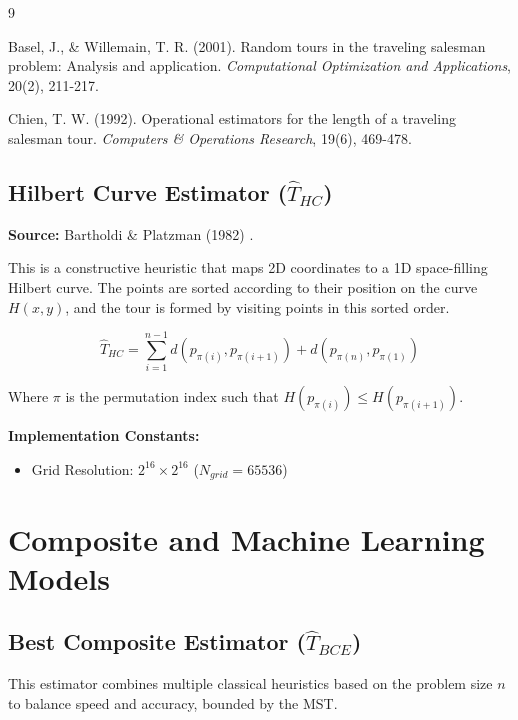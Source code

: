 \documentclass{article}
\begin{document}
\begin{thebibliography}{9}

Basel, J., \& Willemain, T. R. (2001). 
Random tours in the traveling salesman problem: Analysis and application. 
\textit{Computational Optimization and Applications}, 20(2), 211-217.

Chien, T. W. (1992). 
Operational estimators for the length of a traveling salesman tour. 
\textit{Computers \& Operations Research}, 19(6), 469-478.

\end{thebibliography}

\subsection{Hilbert Curve Estimator ($\hat{T}_{HC}$)}
\textbf{Source:} Bartholdi \& Platzman (1982) \cite{bartholdi1982}.

This is a constructive heuristic that maps 2D coordinates to a 1D space-filling Hilbert curve. The points are sorted according to their position on the curve $H(x,y)$, and the tour is formed by visiting points in this sorted order.

\begin{equation}
    \hat{T}_{HC} = \sum_{i=1}^{n-1} d(p_{\pi(i)}, p_{\pi(i+1)}) + d(p_{\pi(n)}, p_{\pi(1)})
\end{equation}

\noindent Where $\pi$ is the permutation index such that $H(p_{\pi(i)}) \le H(p_{\pi(i+1)})$.

\noindent \textbf{Implementation Constants:}
\begin{itemize}
    \item Grid Resolution: $2^{16} \times 2^{16}$ ($N_{grid} = 65536$)
\end{itemize}

\section{Composite and Machine Learning Models}

\subsection{Best Composite Estimator ($\hat{T}_{BCE}$)}
This estimator combines multiple classical heuristics based on the problem size $n$ to balance speed and accuracy, bounded by the MST.
\end{document}

